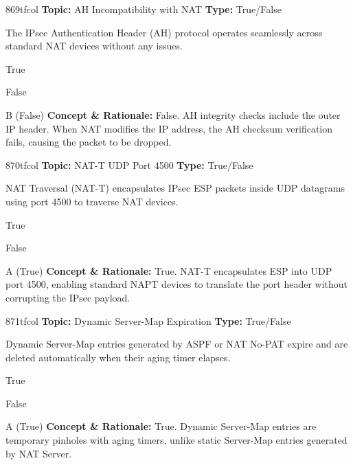 \begin{qcard}{869}{tfcol}
\textcolor{darkslate!75}{\small\textbf{Topic:} AH Incompatibility with NAT \hfill \textbf{Type:} True/False}\vspace{0.4em}\par
The IPsec Authentication Header (AH) protocol operates seamlessly across standard NAT devices without any issues.
\begin{qoptions}
\item True
\item False
\end{qoptions}
\end{qcard}
\nopagebreak
\begin{explainbox}{B (False)}
\textbf{Concept \& Rationale:} False. AH integrity checks include the outer IP header. When NAT modifies the IP address, the AH checksum verification fails, causing the packet to be dropped.
\end{explainbox}

\begin{qcard}{870}{tfcol}
\textcolor{darkslate!75}{\small\textbf{Topic:} NAT-T UDP Port 4500 \hfill \textbf{Type:} True/False}\vspace{0.4em}\par
NAT Traversal (NAT-T) encapsulates IPsec ESP packets inside UDP datagrams using port 4500 to traverse NAT devices.
\begin{qoptions}
\item True
\item False
\end{qoptions}
\end{qcard}
\nopagebreak
\begin{explainbox}{A (True)}
\textbf{Concept \& Rationale:} True. NAT-T encapsulates ESP into UDP port 4500, enabling standard NAPT devices to translate the port header without corrupting the IPsec payload.
\end{explainbox}

\begin{qcard}{871}{tfcol}
\textcolor{darkslate!75}{\small\textbf{Topic:} Dynamic Server-Map Expiration \hfill \textbf{Type:} True/False}\vspace{0.4em}\par
Dynamic Server-Map entries generated by ASPF or NAT No-PAT expire and are deleted automatically when their aging timer elapses.
\begin{qoptions}
\item True
\item False
\end{qoptions}
\end{qcard}
\nopagebreak
\begin{explainbox}{A (True)}
\textbf{Concept \& Rationale:} True. Dynamic Server-Map entries are temporary pinholes with aging timers, unlike static Server-Map entries generated by NAT Server.
\end{explainbox}

